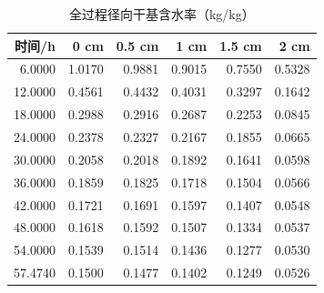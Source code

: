 \begin{table}[htbp]
\centering
\caption{全过程径向干基含水率（kg/kg）}
\label{tab:q3_moisture}
\begin{tabular}{rrrrrr}
\toprule
时间/h & 0 cm & 0.5 cm & 1 cm & 1.5 cm & 2 cm \\
\midrule
6.0000 & 1.0170 & 0.9881 & 0.9015 & 0.7550 & 0.5328 \\
12.0000 & 0.4561 & 0.4432 & 0.4031 & 0.3297 & 0.1642 \\
18.0000 & 0.2988 & 0.2916 & 0.2687 & 0.2253 & 0.0845 \\
24.0000 & 0.2378 & 0.2327 & 0.2167 & 0.1855 & 0.0665 \\
30.0000 & 0.2058 & 0.2018 & 0.1892 & 0.1641 & 0.0598 \\
36.0000 & 0.1859 & 0.1825 & 0.1718 & 0.1504 & 0.0566 \\
42.0000 & 0.1721 & 0.1691 & 0.1597 & 0.1407 & 0.0548 \\
48.0000 & 0.1618 & 0.1592 & 0.1507 & 0.1334 & 0.0537 \\
54.0000 & 0.1539 & 0.1514 & 0.1436 & 0.1277 & 0.0530 \\
57.4740 & 0.1500 & 0.1477 & 0.1402 & 0.1249 & 0.0526 \\
\bottomrule
\end{tabular}
\end{table}
